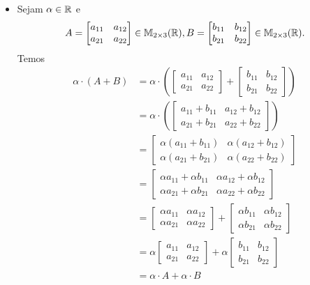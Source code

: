 \documentclass[12pt]{exam}
\begin{document}
\begin{itemize}
        \item Sejam $\alpha \in \mathbb{R}$ e
        \[
        A = \begin{bmatrix} a_{11} & a_{12}\\a_{21} & a_{22}\end{bmatrix} \in \mathbb{M}_{2 \times 3}(\mathbb{R}),
        B = \begin{bmatrix} b_{11} & b_{12}\\b_{21} & b_{22}\end{bmatrix} \in \mathbb{M}_{2 \times 3}(\mathbb{R}).
        \]
        Temos
        \begin{align*}
            \alpha\cdot(A + B) & = \alpha\cdot\left(
            \begin{bmatrix} a_{11} & a_{12}\\a_{21} & a_{22}\end{bmatrix} +
            \begin{bmatrix} b_{11} & b_{12}\\b_{21} & b_{22}\end{bmatrix}\right)
            \\ &= \alpha\cdot\left(\begin{bmatrix} a_{11} + b_{11} & a_{12} + b_{12}\\a_{21} + b_{21} & a_{22} + b_{22}\end{bmatrix}\right)
            \\ &= \begin{bmatrix} \alpha(a_{11} + b_{11}) & \alpha(a_{12} + b_{12})\\\alpha(a_{21} + b_{21}) & \alpha(a_{22} + b_{22})\end{bmatrix}
            \\ &= \begin{bmatrix} \alpha a_{11} + \alpha b_{11} & \alpha a_{12} + \alpha b_{12}\\\alpha a_{21} + \alpha b_{21} & \alpha a_{22} + \alpha b_{22}\end{bmatrix}
            \\ &= \begin{bmatrix} \alpha a_{11} & \alpha a_{12}\\ \alpha a_{21} & \alpha a_{22}\end{bmatrix}
            + \begin{bmatrix} \alpha b_{11} & \alpha b_{12}\\ \alpha b_{21} & \alpha b_{22}\end{bmatrix}
            \\ &= \alpha\begin{bmatrix} a_{11} & a_{12}\\a_{21} & a_{22}\end{bmatrix} +
            \alpha\begin{bmatrix} b_{11} & b_{12}\\b_{21} & b_{22}\end{bmatrix}
            \\ &= \alpha\cdot A + \alpha\cdot B
        \end{align*}


\end{itemize}
\end{document}
